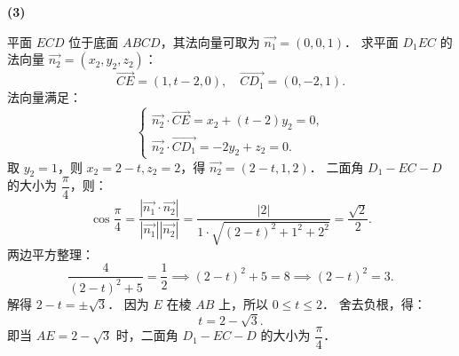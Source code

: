 \begin{answer}
\textbf{(3)}

平面 $ECD$ 位于底面 $ABCD$，其法向量可取为 $\vec{n_1} = (0, 0, 1)$．
求平面 $D_1EC$ 的法向量 $\vec{n_2} = (x_2, y_2, z_2)$：
\nopagebreak[4]
\[
\vec{CE} = (1, t - 2, 0), \quad \vec{CD_1} = (0, -2, 1).
\]
法向量满足：
\nopagebreak[4]
\[
\begin{cases}
\vec{n_2} \cdot \vec{CE} = x_2 + (t - 2)y_2 = 0, \\
\vec{n_2} \cdot \vec{CD_1} = -2y_2 + z_2 = 0.
\end{cases}
\]
取 $y_2 = 1$，则 $x_2 = 2 - t, z_2 = 2$，得 $\vec{n_2} = (2 - t, 1, 2)$．
二面角 $D_1 - EC - D$ 的大小为 $\dfrac{\pi}{4}$，则：
\nopagebreak[4]
\[
\cos\dfrac{\pi}{4} = \dfrac{|\vec{n_1} \cdot \vec{n_2}|}{|\vec{n_1}||\vec{n_2}|} = \dfrac{|2|}{1 \cdot \sqrt{(2 - t)^2 + 1^2 + 2^2}} = \dfrac{\sqrt{2}}{2}.
\]
两边平方整理：
\nopagebreak[4]
\[
\dfrac{4}{(2 - t)^2 + 5} = \dfrac{1}{2} \implies (2 - t)^2 + 5 = 8 \implies (2 - t)^2 = 3.
\]
解得 $2 - t = \pm\sqrt{3}$．
因为 $E$ 在棱 $AB$ 上，所以 $0 \leqslant t \leqslant 2$．
舍去负根，得：
\nopagebreak[4]
\[
t = 2 - \sqrt{3}.
\]
即当 $AE = 2 - \sqrt{3}$ 时，二面角 $D_1 - EC - D$ 的大小为 $\dfrac{\pi}{4}$．




\end{answer}
